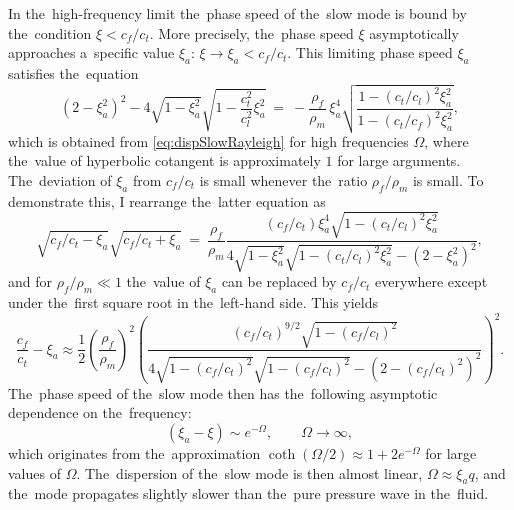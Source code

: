 In the~high-frequency limit the~phase speed of the~slow mode is bound by the~condition $\xi < c_f/c_t$.
More precisely, the~phase speed $\xi$ asymptotically approaches a~specific value $\xi_{a}$: $\xi \rightarrow \xi_{a} < c_f/c_t$.
This limiting phase speed $\xi_a$ satisfies the~equation
\begin{equation}
\left(2-\xi_a^2\right)^2-4\sqrt{1-\xi_a^2}\sqrt{1-\frac{c_t^2}{c_l^2}\xi_a^2}
~=~-\frac{\rho_f}{\rho_m}\,\xi_a^4 \sqrt{\frac{1-\left(c_t/c_l\right)^2\xi_a^2}{1-\left(c_t/c_f\right)^2\xi_a^2}},
\end{equation}
which is obtained from \cref{eq:dispSlowRayleigh} for high frequencies $\Omega$, where the~value of hyperbolic cotangent is approximately $1$ for large arguments.
The~deviation of $\xi_a$ from $c_f/c_t$ is small whenever the~ratio $\rho_f/\rho_m$ is small.
To demonstrate this, I rearrange the~latter equation as
\begin{equation}
\sqrt{c_f/c_t-\xi_a}\sqrt{c_f/c_t+\xi_a}~=~\frac{\rho_f}{\rho_m}\frac{\left(c_f/c_t\right)\xi_a^4 \sqrt{1-\left(c_t/c_l\right)^2\xi_a^2}}{4\sqrt{1-\xi_a^2}\sqrt{1-\left(c_t/c_l\right)^2\xi_a^2}-\left(2-\xi_a^2\right)^2},
\end{equation}
and for $\rho_f/\rho_m \ll 1$ the~value of $\xi_a$ can be replaced by $c_f/c_t$ everywhere except under the~first square root in the~left-hand side.
This yields
\begin{equation}
\label{eq:xiaRayleigh}
\frac{c_f}{c_t}-\xi_a \approx \frac12\left(\frac{\rho_f}{\rho_m}\right)^2 \left(\frac{\left(c_f/c_t\right)^{9/2} \sqrt{1-\left(c_f/c_l\right)^2}}{4\sqrt{1-\left(c_f/c_t\right)^2}\sqrt{1-\left(c_f/c_l\right)^2}-\left(2-\left(c_f/c_t\right)^2\right)^2}\right)^2.
\end{equation}
The~phase speed of the~slow mode then has the~following asymptotic dependence on the~frequency:
\begin{equation}
\left(\xi_a-\xi\right) \sim e^{-\Omega}, \qquad \Omega \rightarrow \infty,
\end{equation}
which originates from the~approximation $\coth \left(\Omega/2\right) \approx 1+2e^{-\Omega}$ for large values of $\Omega$.
The~dispersion of the~slow mode is then almost linear, $\Omega \approx \xi_a q$, and the~mode propagates slightly slower than the~pure pressure wave in the~fluid.


